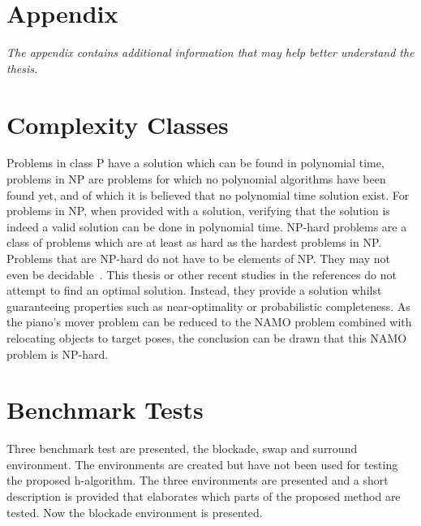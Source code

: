 \chapter*{Appendix}%

\appendix

\textit{The appendix contains additional information that may help better understand the thesis.\bs}

\begingroup
\let\clearpage\relax
\chapter*{Complexity Classes}%
Problems in class P have a solution which can be found in polynomial time, problems in \ac{NP} are problems for which no polynomial algorithms have been found yet, and of which it is believed that no polynomial time solution exist. For problems in \ac{NP}, when provided with a solution, verifying that the solution is indeed a valid solution can be done in polynomial time. \ac{NP-hard} problems are a class of problems which are at least as hard as the hardest problems in \ac{NP}. Problems that are \ac{NP-hard} do not have to be elements of NP. They may not even be decidable~\cite{pokharel_computational_2020}. This thesis or other recent studies in the references do not attempt to find an optimal solution. Instead, they provide a solution whilst guaranteeing properties such as near-optimality or probabilistic completeness. As the piano's mover problem can be reduced to the \ac{NAMO} problem combined with relocating objects to target poses, the conclusion can be drawn that this \ac{NAMO} problem is \ac{NP-hard}.\bs

\newpage
\chapter*{Benchmark Tests}%
Three benchmark test are presented, the blockade, swap and surround environment. The environments are created but have not been used for testing the proposed \ac{h-algorithm}. The three environments are presented and a short description is provided that elaborates which parts of the proposed method are tested. Now the blockade environment is presented.\bs

